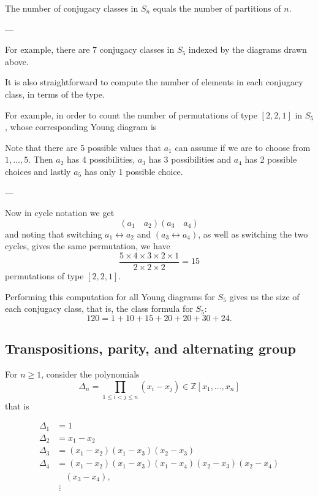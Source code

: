 The number of conjugacy classes in $S_n$ equals the number of partitions of $n$.

---

For example, there are 7 conjugacy classes in $S_5$ indexed by the diagrams drawn above.

It is also straightforward to compute the number of elements in each conjugacy class, in terms of the type.

For example, in order to count the number of permutations of type $[2, 2, 1]$ in $S_5$, whose corresponding Young diagram is

\begin{center}
\end{center}

Note that there are 5 possible values that $a_1$ can assume if we are to choose from $1, \dots, 5$. Then $a_2$ has 4 possibilities, $a_3$ has 3 possibilities and $a_4$ has 2 possible choices and lastly $a_5$ has only 1 possible choice.

---

Now in cycle notation we get
$$ (a_1 \quad a_2)(a_3 \quad a_4) $$
and noting that switching $a_1 \longleftrightarrow a_2$ and $(a_3 \longleftrightarrow a_4)$, as well as switching the two cycles, gives the same permutation, we have
$$ \frac{5 \times 4 \times 3 \times 2 \times 1}{2 \times 2 \times 2} = 15 $$
permutations of type $[2, 2, 1]$.

Performing this computation for all Young diagrams for $S_5$ gives us the size of each conjugacy class, that is, the class formula for $S_5$:
$$ 120 = 1 + 10 + 15 + 20 + 20 + 30 + 24. $$

\subsection*{Transpositions, parity, and alternating group}

For $n \geq 1$, consider the polynomials
$$ \Delta_n = \prod_{1 \leq i < j \leq n} (x_i - x_j) \in \mathbb{Z}[x_1, \dots, x_n] $$
that is

\begin{align*}
\Delta_1 &= 1 \\
\Delta_2 &= x_1 - x_2 \\
\Delta_3 &= (x_1 - x_2)(x_1 - x_3)(x_2 - x_3) \\
\Delta_4 &= (x_1 - x_2)(x_1 - x_3)(x_1 - x_4)(x_2 - x_3)(x_2 - x_4) \\
&\quad (x_3 - x_4), \\
&\;\vdots
\end{align*}

